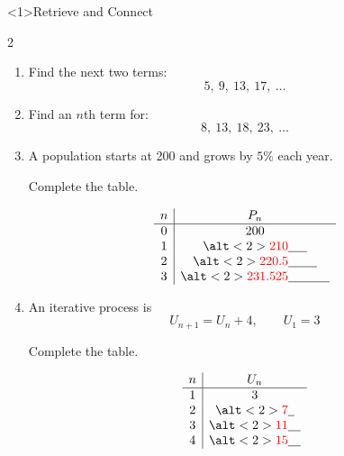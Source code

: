 \documentclass{beamer}
\newcommand{\ablank}[1]{%
  \alt<2>{\textcolor{red}{#1}}{\underline{\phantom{#1}}}%
}
\newcommand{\ashow}[1]{\uncover<2->{\textcolor{red}{\small #1}}}
\begin{document}
\begin{frame}<1>{Retrieve and Connect}

\small

\begin{multicols}{2}

\begin{enumerate}

\item Find the next two terms:
\[
5,\ 9,\ 13,\ 17,\ \dots
\]

\ashow{$21,\ 25$}

\vspace{0.4cm}

\item Find an $n$th term for:
\[
8,\ 13,\ 18,\ 23,\ \dots
\]

\ashow{$5n+3$}

\vspace{0.4cm}

\item A population starts at 200 and grows by $5\%$ each year.

Complete the table.

\[
\begin{array}{c|c}
n & P_n \\
\hline
0 & 200 \\
1 & \ablank{210} \\
2 & \ablank{220.5} \\
3 & \ablank{231.525}
\end{array}
\]

\vspace{0.2cm}


\vspace{0.4cm}

\item An iterative process is
\[
U_{n+1} = U_n + 4, \qquad U_1 = 3
\]

Complete the table.

\[
\begin{array}{c|c}
n & U_n \\
\hline
1 & 3 \\
2 & \ablank{7} \\
3 & \ablank{11} \\
4 & \ablank{15}
\end{array}
\]

\end{enumerate}

\end{multicols}

\end{frame}
\end{document}
